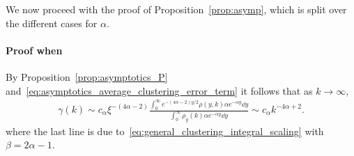 We now proceed with the proof of Proposition~\ref{prop:asymp}, which is split over the different cases for $\alpha$. 

\paragraph{Proof when }
By Proposition~\ref{prop:asymptotics_P} and~\eqref{eq:asymptotics_average_clustering_error_term}  it follows that as $k \to \infty$,
\begin{align*}
	\gamma(k) \sim c_\alpha \xi^{-(4\alpha - 2)} \frac{\int_0^{\infty} e^{-(4\alpha - 2)y/2} \rho(y,k) \alpha  e^{-\alpha y} \dd y}
		{\int_0^\infty \rho_{y}(k) \alpha e^{-\alpha y} \dd y} 
	\sim c_\alpha k^{-4\alpha + 2}.
\end{align*}
where the last line is due to~\eqref{eq:general_clustering_integral_scaling} with $\beta = 2\alpha - 1$.

